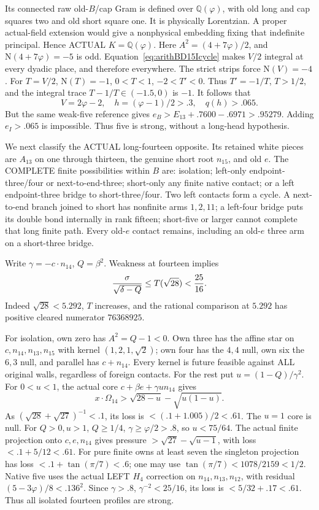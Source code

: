 Its connected raw old-\(B\)/cap Gram is defined over
\(\mathbb Q(\varphi)\), with old long and cap squares
two and old short square one.
It is physically Lorentzian.
A proper actual-field extension would give a
nonphysical embedding fixing that indefinite principal.
Hence ACTUAL \(K=\mathbb Q(\varphi)\).
Here \(A^2=(4+7\varphi)/2\), and
\(\mathrm N(4+7\varphi)=-5\) is odd.
Equation~\eqref{eq:arithBD15Icycle} makes \(V/2\)
integral at every dyadic place, and therefore everywhere.
The strict strips force
\(\mathrm N(V)=-4\).
For \(T=V/2\), \(\mathrm N(T)=-1\), \(0<T<1\),
\(-2<T'<0\).
Thus \(T'=-1/T\), \(T>1/2\), and the integral trace
\(T-1/T\in(-1.5,0)\) is \(-1\).
It follows that
\[
          V=2\varphi-2,\quad h=(\varphi-1)/2>.3,\quad
          q(h)>.065 .
\]
But the same weak-five reference gives
\(e_B>E_{13}+.7600-.6971>.95279\).
Adding \(e_I>.065\) is impossible.
Thus five is strong, without a long-head hypothesis.

We next classify the ACTUAL long-fourteen opposite.
Its retained white pieces are \(A_{13}\) on one
through thirteen, the genuine short root \(n_{15}\),
and old \(e\).
The COMPLETE finite possibilities within \(B\) are:
isolation; left-only endpoint-three/four or next-to-end-three;
short-only any finite native contact;
or a left endpoint-three bridge to short-three/four.
Two left contacts form a cycle.
A next-to-end branch joined to short has nonfinite
arms \(1,2,11\); a left-four bridge puts its double
bond internally in rank fifteen; short-five or larger
cannot complete that long finite path.
Every old-\(e\) contact remains, including an old-\(e\)
three arm on a short-three bridge.

Write \(\gamma=-c\cdot n_{14}\), \(Q=\beta^2\).
Weakness at fourteen implies
\[
 {\sigma\over\sqrt{\delta-Q}}\le T(\sqrt{28})<{25\over16}.
\]
Indeed \(\sqrt{28}<5.292\), \(T\) increases,
and the rational comparison at \(5.292\) has positive
cleared numerator \(76368925\).

For isolation, own zero has \(A^2=Q-1<0\).
Own three has the affine star on \(c,n_{14},n_{13},n_{15}\)
with kernel \((1,2,1,\sqrt2)\);
own four has the \(4,4\) null, own six the \(6,3\)
null, and parallel has \(c+n_{14}\).
Every kernel is future feasible against ALL original
walls, regardless of foreign contacts.
For the rest put \(u=(1-Q)/\gamma^2\).
For \(0<u<1\), the actual core
\(c+\beta e+\gamma u n_{14}\) gives
\[
 x\cdot\Omega_{14}>
          \sqrt{28-u}-\sqrt{u(1-u)}.
\]
As \((\sqrt{28}+\sqrt{27})^{-1}<.1\), its loss is
\(<(.1+1.005)/2<.61\).
The \(u=1\) core is null.
For \(Q>0,u>1\), \(Q\ge1/4\),
\(\gamma\ge\varphi/2>.8\), so \(u<75/64\).
The actual finite projection onto \(c,e,n_{14}\)
gives pressure \(>\sqrt{27}-\sqrt{u-1}\),
with loss \(<.1+5/12<.61\).
For pure finite owns at least seven the singleton
projection has loss \(<.1+\tan(\pi/7)<.6\);
one may use \(\tan(\pi/7)<1078/2159<1/2\).
Native five uses the actual LEFT \(H_4\) correction on
\(n_{14},n_{13},n_{12}\), with residual
\((5-3\varphi)/8<.136^2\).
Since \(\gamma>.8\), \(\gamma^{-2}<25/16\),
its loss is \(<5/32+.17<.61\).
Thus all isolated fourteen profiles are strong.

